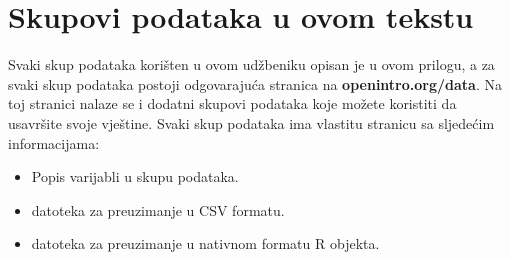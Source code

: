 \chapter{Skupovi podataka u ovom tekstu}
\label{appendix_data}
\label{data_appendix}



Svaki skup podataka korišten u ovom udžbeniku opisan je u ovom prilogu,
a za svaki skup podataka postoji odgovarajuća stranica na
    {\color{black}\textbf{openintro.org/data}}.
Na toj stranici nalaze se i dodatni skupovi podataka koje možete koristiti
da usavršite svoje vještine.
Svaki skup podataka ima vlastitu stranicu sa sljedećim informacijama:
\begin{itemize}
\setlength{\itemsep}{0mm}
\item
    Popis varijabli u skupu podataka.
\item
    datoteka za preuzimanje u CSV formatu.
\item
    datoteka za preuzimanje u nativnom formatu R objekta.
\end{itemize}


\newcommand{\datawrap}[1]{#1 $\to$}
\newcommand{\seedataappendix}[1]{Ovaj skup podataka opisan je u prilogu~\ref{#1}.}
\newcommand{\seedataappendixplural}[1]{Ovi skupovi podataka opisani su u prilogu~\ref{#1}.}
\newcommand{\madeup}{Ovaj primjer je izmišljen.}%



\section{}
\label{ch_intro_to_data_data}

